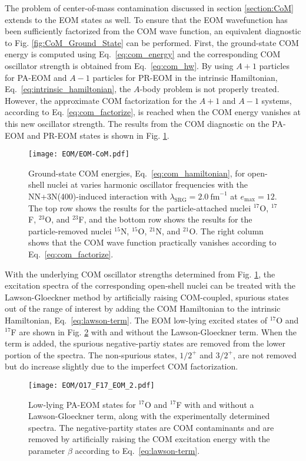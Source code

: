 \documentclass[thesis.tex]{subfiles}
\begin{document}
The problem of center-of-mass contamination discussed in section \ref{section:CoM} extends to the EOM states as well.  To ensure that the EOM wavefunction has been sufficiently factorized from the COM wave function, an equivalent diagnostic to Fig. \ref{fig:CoM_Ground_State} can be performed.  First, the ground-state COM energy is computed using Eq.\ \eqref{eq:com_energy} and the corresponding COM oscillator strength is obtained from Eq.\ \eqref{eq:com_hw}.  By using $A+1$ particles for PA-EOM and $A-1$ particles for PR-EOM in the intrinsic Hamiltonian, Eq.\ \eqref{eq:intrinsic_hamiltonian}, the $A$-body problem is not properly treated.  However, the approximate COM factorization for the $A+1$ and $A-1$ systems, according to Eq. \eqref{eq:com_factorize}, is reached when the COM energy vanishes at this new oscillator strength.  The results from the COM diagnostic on the PA-EOM and PR-EOM states is shown in Fig. \ref{fig:EOM_COM}.
\begin{figure}[h]
  \texttt{[image: EOM/EOM-CoM.pdf]}
  \caption{Ground-state COM energies, Eq.\ \eqref{eq:com_hamiltonian}, for open-shell nuclei at varies harmonic oscillator frequencies with the NN+3N(400)-induced interaction with $\lambda_{\mathrm{SRG}}=2.0\ \mathrm{fm}^{-1}$ at $e_{\mathrm{max}}=12$.  The top row shows the results for the particle-attached nuclei ${}^{17}$O, ${}^{17}$F, ${}^{23}$O, and ${}^{23}$F, and the bottom row shows the results for the particle-removed nuclei ${}^{15}$N, ${}^{15}$O, ${}^{21}$N, and ${}^{21}$O.  The right column shows that the COM wave function practically vanishes according to Eq.\ \eqref{eq:com_factorize}.}
  \label{fig:EOM_COM}
\end{figure}

With the underlying COM oscillator strengths determined from Fig. \ref{fig:EOM_COM}, the excitation spectra of the corresponding open-shell nuclei can be treated with the Lawson-Gloeckner method \cite{GLOECKNER1974313} by artificially raising COM-coupled, spurious states out of the range of interest by adding the COM Hamiltonian to the intrinsic Hamiltonian, Eq.\ \eqref{eq:lawson-term}.  The EOM low-lying excited states of $^{17}$O and $^{17}$F are shown in Fig. \ref{fig:O17F17_spectra} with and without the Lawson-Gloeckner term.  When the term is added, the spurious negative-partiy states are removed from the lower portion of the spectra.  The non-spurious states, $1/2^{+}$ and $3/2^{+}$, are not removed but do increase slightly due to the imperfect COM factorization.

\begin{figure}[h]
  \texttt{[image: EOM/O17\_F17\_EOM\_2.pdf]}
  \caption{Low-lying PA-EOM states for $^{17}$O and $^{17}$F with and without a Lawson-Gloeckner term, along with the experimentally determined spectra.  The negative-partity states are COM contaminants and are removed by artificially raising the COM excitation energy with the parameter $\beta$ according to Eq.\ \eqref{eq:lawson-term}.}
  \label{fig:O17F17_spectra}
\end{figure}
\end{document}
